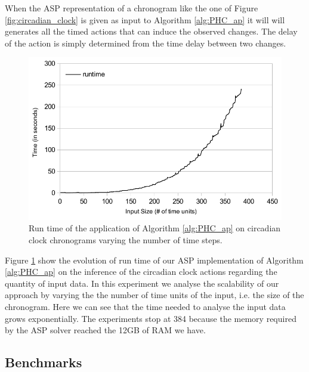 When the ASP representation of a chronogram like the one of Figure \ref{fig:circadian_clock} is given as input to Algorithm \ref{alg:PHC_ap} it will will generates all the timed actions that can induce the observed changes.
The delay of the action is simply determined from the time delay between two changes.

\begin{figure}[htb!]
\begin{center}
\includegraphics[width=0.6\linewidth]{images/circadian_run_time}
\end{center}
\caption{Run time of the application of Algorithm \ref{alg:PHC_ap} on circadian clock chronograms varying the number of time steps.}
\label{fig:run_time}
\end{figure}

Figure \ref{fig:run_time} show the evolution of run time of our ASP implementation of Algorithm \ref{alg:PHC_ap} on the inference of the circadian clock actions regarding the quantity of input data.
In this experiment we analyse the scalability of our approach by varying the the number of time units of the input, i.e. the size of the chronogram.
Here we can see that the time needed to analyse the input data grows exponentially.
The experiments stop at 384 because the memory required by the ASP solver reached the 12GB of RAM we have.

\subsection{Benchmarks}
